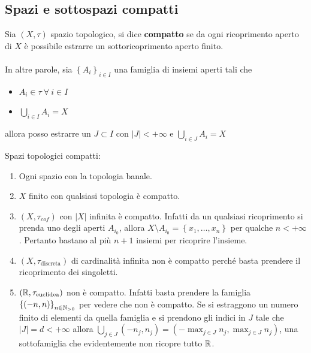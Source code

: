 \subsection{\textcolor{TopGener}{\textbf{Spazi e sottospazi compatti}}}



\begin{definition}
	Sia $(X, \tau)$ spazio topologico, si dice \textbf{compatto} se da ogni ricoprimento aperto di $X$ è possibile estrarre un sottoricoprimento aperto finito. \\ \\ In altre parole, sia $\left\{A_i\right\}_{i\in I}$ una famiglia di insiemi aperti tali che
	\begin{itemize}
		\item $A_i \in \tau \ \forall \ i\in I$
		\item $\bigcup_{i \in I} A_i = X$
	\end{itemize}
	allora posso estrarre un $J \subset I$ con $|J| < +\infty$ e $\bigcup_{i \in J} A_i = X$
\end{definition} 

\begin{example} Spazi topologici compatti:
\begin{enumerate}
	\item Ogni spazio con la topologia banale.
	\item $X$ finito con qualsiasi topologia è compatto.
	\item $(X, \tau_{cof})$ con $|X|$ infinita è compatto. Infatti da un qualsiasi ricoprimento si prenda uno degli aperti $A_{i_0}$, allora $X \setminus A_{i_0} = \left\{x_1, \dots, x_n\right\}$ per qualche $n < +\infty$. Pertanto bastano al più $n+1$ insiemi per ricoprire l'insieme.
	\item $(X,\tau_{\text{discreta}})$ di cardinalità infinita non è compatto perché basta prendere il ricoprimento dei singoletti.
	\item $(\mathbb{R}, \tau_{\text{euclidea}})$ non è compatto. Infatti basta prendere la famiglia $\left\{(-n, n)\right\}_{n \in \mathbb{N}_{>0}}$ per vedere che non è compatto. Se si estraggono un numero finito di elementi da quella famiglia e si prendono gli indici in $J$ tale che $|J| = d < +\infty$ allora $\bigcup_{j \in J}(-n_j, n_j) = (-\max_{j \in J} n_j,  \max_{j \in J} n_j)$, una sottofamiglia che evidentemente non ricopre tutto $\mathbb{R}$.
\end{enumerate}
\end{example}

